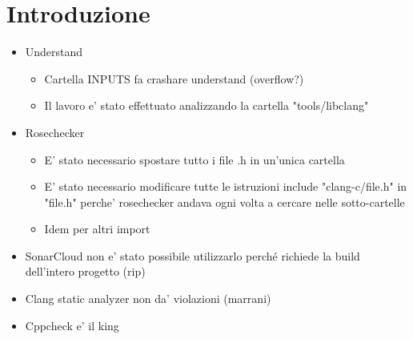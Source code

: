 \chapter{Introduzione}

\begin{itemize}
	\item Understand
		\begin{itemize}
			\item Cartella INPUTS fa crashare understand (overflow?)
			\item Il lavoro e' stato effettuato analizzando la cartella "tools/libclang"
		\end{itemize}
	\item Rosechecker
		\begin{itemize}
			\item E' stato necessario spostare tutto i file .h in un'unica cartella
			\item E' stato necessario modificare tutte le istruzioni include "clang-c/file.h" in "file.h" perche' rosechecker andava ogni volta a cercare nelle sotto-cartelle
			\item Idem per altri import
		\end{itemize}
	\item SonarCloud non e' stato possibile utilizzarlo perché richiede la build dell'intero progetto (rip)
	\item Clang static analyzer non da' violazioni (marrani)
	\item Cppcheck e' il king
\end{itemize}